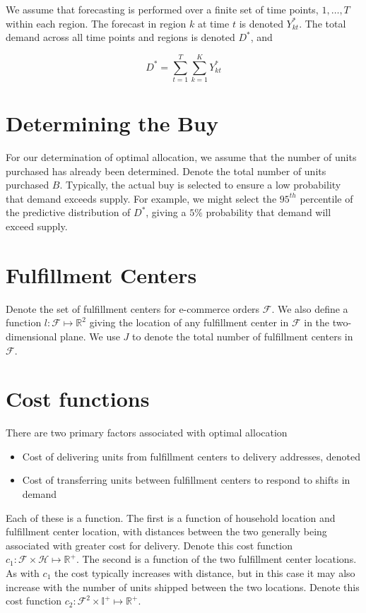 \documentclass[11pt, oneside]{article}   	%
\begin{document}
\noindent We assume that forecasting is performed over a finite set of time points, $1, \ldots, T$ within each region.  The forecast in region $k$ at time $t$ is denoted $Y_{kt}^*$.  The total demand across all time points and regions is denoted $D^*$, and

$$D^* = \sum_{t = 1}^T \sum_{k = 1}^K Y_{kt}^*$$

\section{Determining the Buy}

For our determination of optimal allocation, we assume that the number of units purchased has already been determined.  Denote the total number of units purchased $B$.  Typically, the actual buy is selected to ensure a low probability that demand exceeds supply.  For example, we might select the $95^{th}$ percentile of the predictive distribution of $D^*$, giving a $5\%$ probability that demand will exceed supply.

\section{Fulfillment Centers}

Denote the set of fulfillment centers for e-commerce orders $\mathcal{F}$.  We also define a function $l \colon \mathcal{F} \mapsto \mathbb{R}^2$ giving the location of any fulfillment center in $\mathcal{F}$ in the two-dimensional plane.  We use $J$ to denote the total number of fulfillment centers in $\mathcal{F}$.

\section{Cost functions}

There are two primary factors associated with optimal allocation

\begin{itemize}
\item Cost of delivering units from fulfillment centers to delivery addresses, denoted
\item Cost of transferring units between fulfillment centers to respond to shifts in demand
\end{itemize}

Each of these is a function.  The first is a function of household location and fulfillment center location, with distances between the two generally being associated with greater cost for delivery.  Denote this cost function $c_1 \colon \mathcal{F} \times \mathcal{H} \mapsto \mathbb{R}^+$.  The second is a function of the two fulfillment center locations.  As with $c_1$ the cost typically increases with distance, but in this case it may also increase with the number of units shipped between the two locations.  Denote this cost function $c_2 \colon \mathcal{F}^2 \times \mathbb{I}^+ \mapsto \mathbb{R}^+$.
\end{document}
